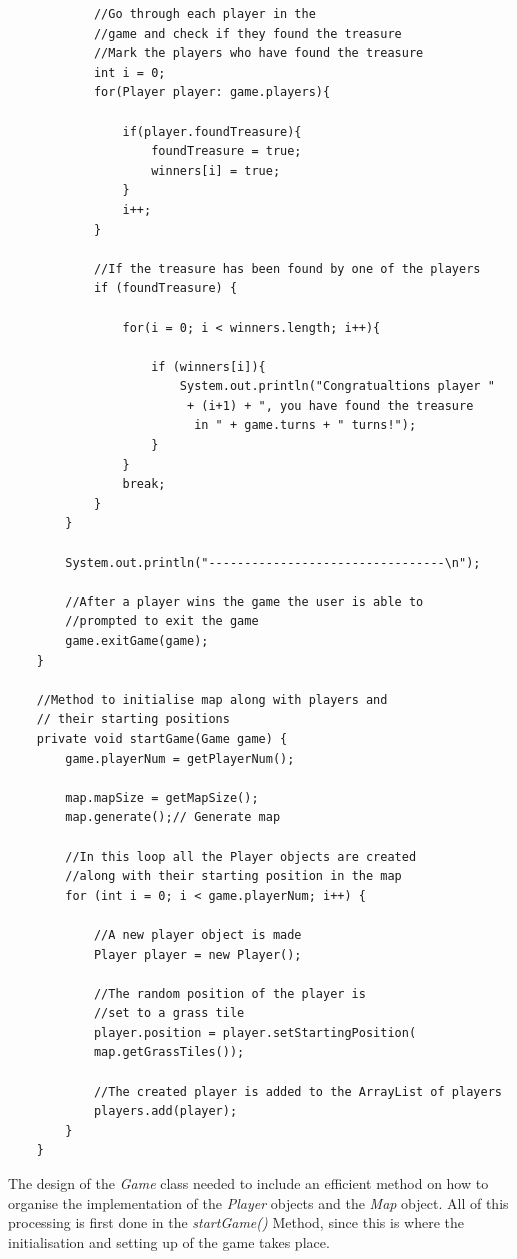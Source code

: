 \documentclass[a4paper,12pt]{extarticle}
\begin{document}
\begin{lstlisting}
            //Go through each player in the 
            //game and check if they found the treasure
            //Mark the players who have found the treasure
            int i = 0;
            for(Player player: game.players){

                if(player.foundTreasure){
                    foundTreasure = true;
                    winners[i] = true;
                }
                i++;
            }

            //If the treasure has been found by one of the players
            if (foundTreasure) {

                for(i = 0; i < winners.length; i++){

                    if (winners[i]){
                        System.out.println("Congratualtions player "
                         + (i+1) + ", you have found the treasure
                          in " + game.turns + " turns!");
                    }
                }
                break;
            }
        }

        System.out.println("---------------------------------\n");

        //After a player wins the game the user is able to
        //prompted to exit the game
        game.exitGame(game);
    }

    //Method to initialise map along with players and
    // their starting positions
    private void startGame(Game game) {
        game.playerNum = getPlayerNum();

        map.mapSize = getMapSize();
        map.generate();// Generate map

        //In this loop all the Player objects are created 
        //along with their starting position in the map
        for (int i = 0; i < game.playerNum; i++) {

            //A new player object is made
            Player player = new Player();

            //The random position of the player is 
            //set to a grass tile
            player.position = player.setStartingPosition(
            map.getGrassTiles());

            //The created player is added to the ArrayList of players
            players.add(player);
        }
    }

\end{lstlisting}
\vspace{4mm}

\noindent The design of the \textit{Game} class needed to include an efficient method on how to organise the implementation of the \textit{Player} objects and the \textit{Map} object. All of this processing is first done in the \textit{startGame()} Method, since this is where the initialisation and setting up of the game takes place.\\
\end{document}
